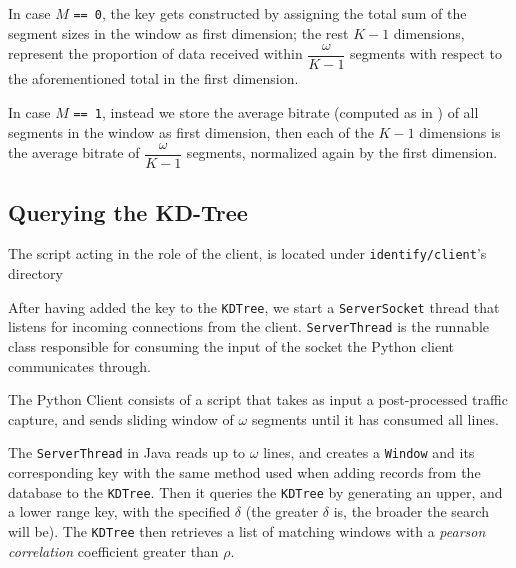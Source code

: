 In case $M$ \texttt{== 0}, the key gets constructed by assigning the
total sum of the segment sizes in the window as first dimension; the
rest $K - 1$ dimensions, represent the proportion of data received
within $\dfrac{\omega}{K-1}$ segments with respect to the
aforementioned total in the first dimension.

In case $M$ \texttt{== 1}, instead we store the average bitrate
(computed as in ) of all segments in the window as
first dimension, then each of the $K-1$ dimensions is the average
bitrate of $\dfrac{\omega}{K-1}$ segments, normalized again by the
first dimension.

\subsection{Querying the KD-Tree}

The script acting in the role of the client, is located under \texttt{identify/client}'s directory


After having added the key to the \texttt{KDTree}, we start a
\texttt{ServerSocket} thread that listens for incoming connections from the
client. \texttt{ServerThread} is the runnable class responsible for consuming
the input of the socket the Python client communicates through. 

The Python Client consists of a script that takes as input a post-processed
traffic capture, and sends sliding window of $\omega$ segments until it has
consumed all lines.

The \texttt{ServerThread} in Java reads up to $\omega$ lines, and creates a
\texttt{Window} and its corresponding key with the same method used when adding
records from the database to the \texttt{KDTree}. Then it queries the
\texttt{KDTree} by generating an upper, and a lower range key, with the
specified $\delta$ (the greater $\delta$ is, the broader the search will be).
The \texttt{KDTree} then retrieves a list of matching windows with a
\emph{pearson correlation} coefficient greater than $\rho$.
